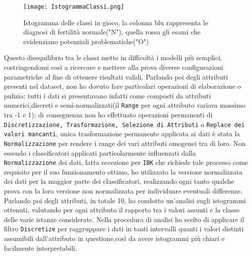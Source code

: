   \begin{figure}[H]
  	\texttt{[image: IstogrammaClassi.png]}
  	\caption{Istogramma delle classi in gioco, la colonna blu rappresenta le diagnosi di fertilità normale("N"), quella rossa gli esami che evidenziano potenziali problematiche("O")}
  \end{figure}

Questo disequilibrio tra le classi mette in difficoltà i modelli più semplici, costringendomi così a ricercare e mettere alla prova diverse configurazioni parametriche al fine di ottenere risultati validi.
Parlando poi degli attributi presenti nel dataset, non ho dovuto fare particolari operazioni di elaborazione o pulizia: tutti i dati si presentavano infatti come composti da attributi numerici,discreti e semi-normalizzati(il \texttt{Range} per ogni attributo variava massimo tra -1 e 1); di conseguenza non ho effettuato operazioni permanenti di \texttt{Discretizzazione, Trasformazione, Selezione di Attributi} o \texttt{Replace dei valori mancanti}, unica trasformazione permanente applicata ai dati è stata la \texttt{Normalizzazione} per rendere i range dei vari attributi omogenei tra di loro.
Non essendo i classificatori applicati particolarmente influenzati dalla \texttt{Normalizzazione} dei dati, fatta eccezione per \texttt{IBK} che richiede tale processo come requisito per il suo funzionamento ottimo, ho utilizzato la versione normalizzata dei dati per la maggior parte dei classificatori, realizzando ogni tanto qualche prova con la loro versione non normalizzata per individuare eventuali differenze.\\
Parlando poi degli attributi, in totale 10, ho condotto un'analisi sugli istogrammi ottenuti, valutando per ogni attributo il rapporto tra i valori assunti e la classe delle varie istanze considerate.
Nella procedura di analisi ho scelto di applicare il filtro \texttt{Discretize} per raggruppare i dati in tanti intervalli quanti i valori distinti assumibili dall'attributo in questione,così da avere istogrammi più chiari e facilmente interpretabili.


